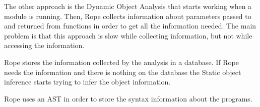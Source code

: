 The other approach is the Dynamic Object Analysis that starts working when a
module is running.
Then, Rope collects information about parameters passed to and returned from
functions in order to get all the information needed.
The main problem is that this approach is slow while collecting information,
but not while accessing the information.

Rope stores the information collected by the analysis in a database.
If Rope needs the information and there is nothing on the database the Static
object inference starts trying to infer the object information.

Rope uses an AST in order to store the syntax information about the programs.

